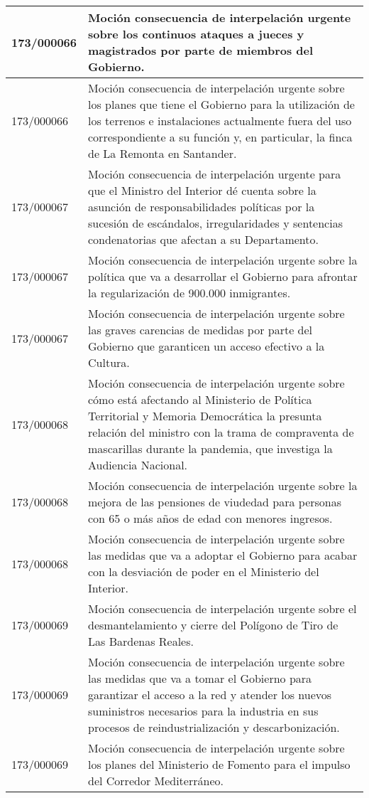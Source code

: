 {\begin{table}[H]
\begin{center}
\begin{tabularx}{\linewidth}{| l | X |}
\hline
173/000066 & Moción consecuencia de interpelación urgente sobre los continuos ataques a jueces y magistrados por parte de miembros del Gobierno. \\
\hline
173/000066 & Moción consecuencia de interpelación urgente sobre los planes que tiene el Gobierno para la utilización de los terrenos e instalaciones actualmente fuera del uso correspondiente a su función y, en particular, la finca de La Remonta en Santander. \\
\hline
173/000067 & Moción consecuencia de interpelación urgente para que el Ministro del Interior dé cuenta sobre la asunción de responsabilidades políticas por la sucesión de escándalos, irregularidades y sentencias condenatorias que afectan a su Departamento. \\
\hline
173/000067 & Moción consecuencia de interpelación urgente sobre la política que va a desarrollar el Gobierno para afrontar la regularización de 900.000 inmigrantes. \\
\hline
173/000067 & Moción consecuencia de interpelación urgente sobre las graves carencias de medidas por parte del Gobierno que garanticen un acceso efectivo a la Cultura. \\
\hline
173/000068 & Moción consecuencia de interpelación urgente sobre cómo está afectando al Ministerio de Política Territorial y Memoria Democrática la presunta relación del ministro con la trama de compraventa de mascarillas durante la pandemia, que investiga la Audiencia Nacional. \\
\hline
173/000068 & Moción consecuencia de interpelación urgente sobre la mejora de las pensiones de viudedad para personas con 65 o más años de edad con menores ingresos. \\
\hline
173/000068 & Moción consecuencia de interpelación urgente sobre las medidas que va a adoptar el Gobierno para acabar con la desviación de poder en el Ministerio del Interior. \\
\hline
173/000069 & Moción consecuencia de interpelación urgente sobre el desmantelamiento y cierre del Polígono de Tiro de Las Bardenas Reales. \\
\hline
173/000069 & Moción consecuencia de interpelación urgente sobre las medidas que va a tomar el Gobierno para garantizar el acceso a la red y atender los nuevos suministros necesarios para la industria en sus procesos de reindustrialización y descarbonización. \\
\hline
173/000069 & Moción consecuencia de interpelación urgente sobre los planes del Ministerio de Fomento para el impulso del Corredor Mediterráneo. \\

\end{tabularx}
\end{center}
\end{table}}
